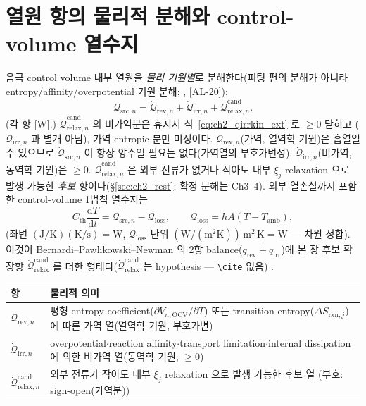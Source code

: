 \documentclass[11pt,a4paper]{article}
\newcommand{\dd}{\mathrm{d}}
\newcommand{\OCV}{\mathrm{OCV}}
\newcommand{\irr}{\mathrm{irr}}
\newcommand{\rev}{\mathrm{rev}}
\newcommand{\rxn}{\mathrm{rxn}}
\newcommand{\src}{\mathrm{src}}
\newcommand{\loss}{\mathrm{loss}}
\newcommand{\amb}{\mathrm{amb}}
\newcommand{\rlx}{\mathrm{relax}}
\newcommand{\cand}{\mathrm{cand}}
\newcommand{\AL}[1]{\textsf{[AL-#1]}}
\begin{document}
\section{열원 항의 물리적 분해와 control-volume 열수지}\label{sec:ch2_decomp}
음극 control volume 내부 열원을 \emph{물리 기원별}로 분해한다(피팅 편의 분해가 아니라 entropy/affinity/overpotential
기원 분해; \cite{bernardi1985,rao1997}, \AL{20}):
\begin{equation}
\dot{\mathcal Q}_{\src,n}=\dot{\mathcal Q}_{\rev,n}+\dot{\mathcal Q}_{\irr,n}+\dot{\mathcal Q}_{\rlx,n}^{\cand}.
\label{eq:ch2_srcdecomp}
\end{equation}
(각 항 [W].) $\dot{\mathcal Q}_{\rlx,n}^{\cand}$ 의 비가역분은 휴지서 식~\eqref{eq:ch2_qirrkin_ext} 로 $\ge0$ 닫히고
($\dot{\mathcal Q}_{\irr,n}$ 과 별개 아님), 가역 entropic 분만 미정이다.
$\dot{\mathcal Q}_{\rev,n}$(가역, 열역학 기원)은 흡열일 수 있으므로 $\dot{\mathcal Q}_{\src,n}$ 이 항상 양수일
필요는 없다(가역열의 부호가변성). $\dot{\mathcal Q}_{\irr,n}$(비가역, 동역학 기원)은 $\ge0$. $\dot{\mathcal Q}_{\rlx,n}^{\cand}$
은 외부 전류가 없거나 작아도 내부 $\xi_j$ relaxation 으로 발생 가능한 \emph{후보} 항이다(\S\ref{sec:ch2_rest};
확정 분해는 Ch3--4). 외부 열손실까지 포함한 control-volume 1법칙 열수지는
\begin{equation}
C_{\mathrm{th}}\frac{\dd T}{\dd t}=\dot{\mathcal Q}_{\src,n}-\dot{\mathcal Q}_{\loss},\qquad
\dot{\mathcal Q}_{\loss}=hA(T-T_\amb),
\label{eq:ch2_balance}
\end{equation}
(좌변 $\mathrm{(J/K)(K/s)=W}$, $\dot{\mathcal Q}_{\loss}$ 단위 $\mathrm{(W/(m^2K))\,m^2\,K=W}$ — 차원 정합).
이것이 Bernardi--Pawlikowski--Newman 의 2항 balance($q_\rev+q_\irr$)에 본 장 후보 확장항 $\dot{\mathcal Q}_{\rlx}^{\cand}$
를 더한 형태다($\dot{\mathcal Q}_{\rlx}^{\cand}$ 는 hypothesis — \texttt{\textbackslash cite} 없음) \cite{bernardi1985,rao1997}.
\begin{longtable}{p{} p{}}
\toprule 항 & 물리적 의미 \\ \midrule \endhead
$\dot{\mathcal Q}_{\rev,n}$ & 평형 entropy coefficient($\partial V_{n,\OCV}/\partial T$) 또는 transition entropy($\Delta S_{\rxn,j}$)에 따른 가역 열(열역학 기원, 부호가변) \\
$\dot{\mathcal Q}_{\irr,n}$ & overpotential$\cdot$reaction affinity$\cdot$transport limitation$\cdot$internal dissipation 에 의한 비가역 열(동역학 기원, $\ge0$) \\
$\dot{\mathcal Q}_{\rlx,n}^{\cand}$ & 외부 전류가 작아도 내부 $\xi_j$ relaxation 으로 발생 가능한 후보 열 (부호: sign-open(가역분)) \\
\bottomrule
\end{longtable}
\end{document}
